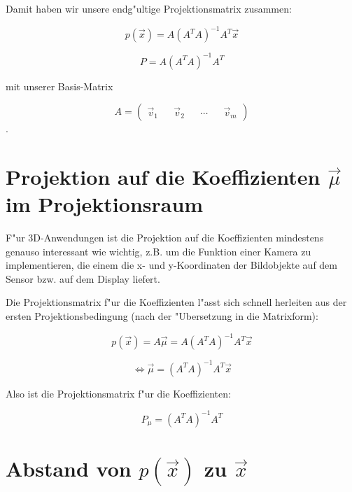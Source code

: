 \documentclass{article}
\begin{document}
Damit haben wir unsere endg"ultige Projektionsmatrix zusammen:

	\begin{equation}
		p(\vec{x}) = A(A^T A)^{-1} A^T \vec{x}
	\end{equation}

	\begin{equation}
		P = A(A^T A)^{-1} A^T
	\end{equation}

mit unserer Basis-Matrix

	\begin{equation}
		A = \begin{pmatrix} \vec{v}_1 && \vec{v}_2 && \cdots && \vec{v}_m \end{pmatrix}
	\end{equation}.






\section{Projektion auf die Koeffizienten \(\vec{\mu}\) im Projektionsraum}

F"ur 3D-Anwendungen ist die Projektion auf die Koeffizienten mindestens genauso interessant wie
wichtig, z.B. um die Funktion einer Kamera zu implementieren, die einem die x- und y-Koordinaten
der Bildobjekte auf dem Sensor bzw. auf dem Display liefert.

Die Projektionsmatrix f"ur die Koeffizienten l"asst sich schnell herleiten aus der ersten
Projektionsbedingung (nach der "Ubersetzung in die Matrixform):

	\begin{equation}
		p(\vec{x}) = A \vec{\mu} = A(A^T A)^{-1} A^T \vec{x}
	\end{equation}

	\begin{equation}
		\iff \vec{\mu} = (A^T A)^{-1} A^T \vec{x}
	\end{equation}

Also ist die Projektionsmatrix f"ur die Koeffizienten:

	\begin{equation}
		P_{\mu} = (A^T A)^{-1} A^T
	\end{equation}






\section{Abstand von \(p(\vec{x})\) zu \(\vec{x}\)}
\end{document}
